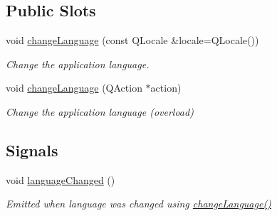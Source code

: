 \subsection*{Public Slots}
\begin{DoxyCompactItemize}
\item 
void \hyperlink{classmdt_application_a60cf66d3ebe17d1e60a7dcc26410494d}{change\-Language} (const Q\-Locale \&locale=Q\-Locale())
\begin{DoxyCompactList}\small\item\em Change the application language. \end{DoxyCompactList}\item 
void \hyperlink{classmdt_application_a7eec3fbe97863cb4a938fa58a5135b1b}{change\-Language} (Q\-Action $\ast$action)
\begin{DoxyCompactList}\small\item\em Change the application language (overload) \end{DoxyCompactList}\end{DoxyCompactItemize}
\subsection*{Signals}
\begin{DoxyCompactItemize}
\item 
void \hyperlink{classmdt_application_a4200ade3b0b295ea8b0cb5239d967610}{language\-Changed} ()
\begin{DoxyCompactList}\small\item\em Emitted when language was changed using \hyperlink{classmdt_application_a60cf66d3ebe17d1e60a7dcc26410494d}{change\-Language()} \end{DoxyCompactList}\end{DoxyCompactItemize}
